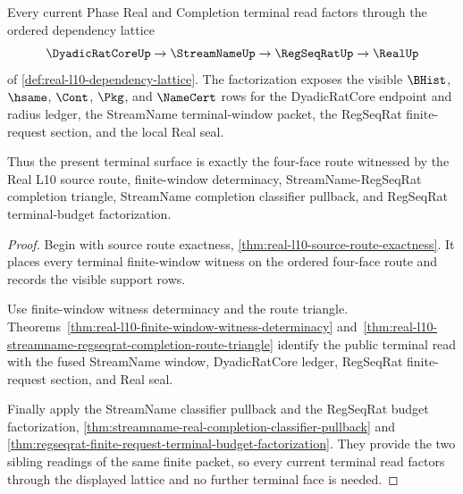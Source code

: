 \begin{theorem}
\label{thm:real-l10-dependency-lattice-exit-totality}
Every current Phase Real and Completion terminal read factors through the ordered dependency lattice
$$
\DyadicRatCoreUp \to \StreamNameUp \to \RegSeqRatUp \to \RealUp
$$
of \autoref{def:real-l10-dependency-lattice}. The factorization exposes the visible $\BHist$, $\hsame$, $\Cont$, $\Pkg$, and $\NameCert$ rows for the DyadicRatCore endpoint and radius ledger, the StreamName terminal-window packet, the RegSeqRat finite-request section, and the local Real seal.

Thus the present terminal surface is exactly the four-face route witnessed by the Real L10 source route, finite-window determinacy, StreamName-RegSeqRat completion triangle, StreamName completion classifier pullback, and RegSeqRat terminal-budget factorization.
\end{theorem}
\begin{proof}
Begin with source route exactness, \autoref{thm:real-l10-source-route-exactness}. It places every terminal finite-window witness on the ordered four-face route and records the visible support rows.

Use finite-window witness determinacy and the route triangle. Theorems~\ref{thm:real-l10-finite-window-witness-determinacy} and~\ref{thm:real-l10-streamname-regseqrat-completion-route-triangle} identify the public terminal read with the fused StreamName window, DyadicRatCore ledger, RegSeqRat finite-request section, and Real seal.

Finally apply the StreamName classifier pullback and the RegSeqRat budget factorization, \autoref{thm:streamname-real-completion-classifier-pullback} and \autoref{thm:regseqrat-finite-request-terminal-budget-factorization}. They provide the two sibling readings of the same finite packet, so every current terminal read factors through the displayed lattice and no further terminal face is needed.
\end{proof}

